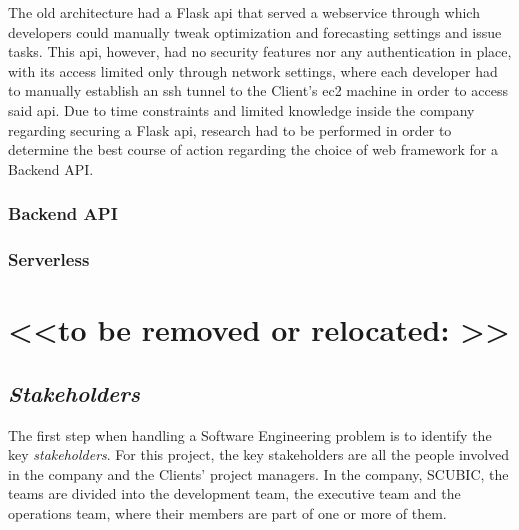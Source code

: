 The old architecture had a Flask \gls{api} that served a webservice through which developers could manually tweak optimization and forecasting settings and issue tasks. This api, however, had no security features nor any authentication in place, with its access limited only through network settings, where each developer had to manually establish an \gls{ssh} tunnel to the Client's \gls{ec2} machine in order to access said api. Due to time constraints and limited knowledge inside the company regarding securing a Flask api, research had to be performed in order to determine the best course of action regarding the choice of web framework for a Backend API.

\subsubsection{Backend API}\label{methodology:sss:backendapi}
\subsubsection{Serverless}\label{methodology:sss:serverless}



\section{<<to be removed or relocated: >>}

\subsection{\textit{Stakeholders}}\label{methodology:s:stakeholders}

The first step when handling a Software Engineering problem is to identify the key \textit{stakeholders}. For this project, the key stakeholders are all the people involved in the company and the Clients' project managers. In the company, SCUBIC, the teams are divided into the development team, the executive team and the operations team, where their members are part of one or more of them.